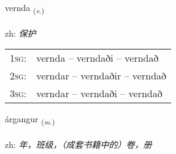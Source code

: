 \documentclass[frontgrid, backgrid]{flacards}\usepackage[]{graphicx}\usepackage[]{color}
\begin{document}
\renewcommand{\flhead}{\vskip5pt \fboxsep=0pt {\small\bfseries\footnotesize Sagnorð | 动词}}
\renewcommand{\fcfoot}{\vskip5pt \fboxsep=0pt \hspace{2pt}{\small\bfseries\footnotesize 2K}}

\renewcommand{\blhead}{\vskip5pt {\small\bfseries\footnotesize Sagnorð | 动词 }}
\renewcommand{\bcfoot}{\vskip5pt \hspace{2pt}{\small\bfseries\footnotesize 2K}}


{vernda \small{\textsubscript{(\textit{v.})}} \\[1ex] %
\textphonetic{[vɛrnta]} \\
zh: \emph{保护} \\  [2ex]
\renewcommand*{\arraystretch}{0.8}
\begin{tabular}{p{1cm}l}
\textsc{1sg}: & vernda -- verndaði -- verndað \\ 
\textsc{2sg}: & verndar -- verndaðir -- verndað \\ 
\textsc{3sg}: & verndar -- verndaði -- verndað \\ 
\end{tabular}
}

\renewcommand{\flhead}{\vskip5pt \fboxsep=0pt {\small\bfseries\footnotesize Nafnorð | 名词}}
\renewcommand{\fcfoot}{\vskip5pt \fboxsep=0pt \hspace{2pt}{\small\bfseries\footnotesize 2K}}

\renewcommand{\blhead}{\vskip5pt {\small\bfseries\footnotesize Nafnorð | 名词 }}
\renewcommand{\bcfoot}{\vskip5pt \hspace{2pt}{\small\bfseries\footnotesize 2K}}


{árgangur \small{\textsubscript{(\textit{m.})}} \\[1ex] %
\textphonetic{[aurkauŋkʏr]} \\
zh: \emph{年，班级，（成套书籍中的）卷，册} \\  [2ex]
\renewcommand*{\arraystretch}{0.8}
}
\end{document}
